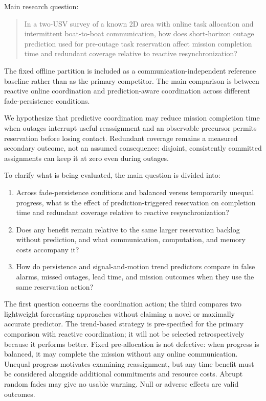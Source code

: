 Main research question:

\begin{quote}
In a two-USV survey of a known 2D area with online task allocation and intermittent boat-to-boat communication, how does short-horizon outage prediction used for pre-outage task reservation affect mission completion time and redundant coverage relative to reactive resynchronization?
\end{quote}

The fixed offline partition is included as a communication-independent reference baseline rather than as the primary competitor. The main comparison is between reactive online coordination and prediction-aware coordination across different fade-persistence conditions.

We hypothesize that predictive coordination may reduce mission completion time when outages interrupt useful reassignment and an observable precursor permits reservation before losing contact. Redundant coverage remains a measured secondary outcome, not an assumed consequence: disjoint, consistently committed assignments can keep it at zero even during outages.

To clarify what is being evaluated, the main question is divided into:
\begin{enumerate}[label=\textbf{RQ\arabic*.}]
\item Across fade-persistence conditions and balanced versus temporarily unequal progress, what is the effect of prediction-triggered reservation on completion time and redundant coverage relative to reactive resynchronization?
\item Does any benefit remain relative to the same larger reservation backlog without prediction, and what communication, computation, and memory costs accompany it?
\item How do persistence and signal-and-motion trend predictors compare in false alarms, missed outages, lead time, and mission outcomes when they use the same reservation action?
\end{enumerate}

The first question concerns the coordination action; the third compares two lightweight forecasting approaches without claiming a novel or maximally accurate predictor. The trend-based strategy is pre-specified for the primary comparison with reactive coordination; it will not be selected retrospectively because it performs better. Fixed pre-allocation is not defective: when progress is balanced, it may complete the mission without any online communication. Unequal progress motivates examining reassignment, but any time benefit must be considered alongside additional commitments and resource costs. Abrupt random fades may give no usable warning. Null or adverse effects are valid outcomes.
